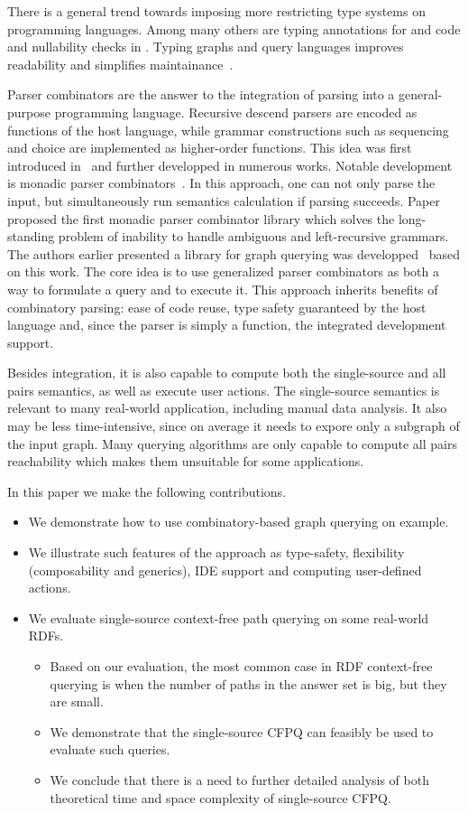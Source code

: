 There is a general trend towards imposing more restricting type systems on programming languages. 
Among many others are typing annotations for \python{} and \typescript{} code and nullability checks in \kotlin{}.
Typing graphs and query languages improves  readability and simplifies maintainance~\cite{10.1145/2076623.2076653}.

Parser combinators are the answer to the integration of parsing into a general-purpose programming language.
Recursive descend parsers are encoded as functions of the host language, while grammar constructions such as sequencing and choice are implemented as higher-order functions. 
This idea was first introduced in~\cite{burge} and further developped in numerous works. 
Notable development is monadic parser combinators~\cite{hutton1996monadic}. 
In this approach, one can not only parse the input, but simultaneously run semantics calculation if parsing succeeds.
Paper~\cite{izmaylova2016practical} proposed the first monadic parser combinator library which solves the long-standing problem of inability to handle ambiguous and left-recursive grammars. 
The authors earlier presented a library for graph querying was developped~\cite{10.1145/3241653.3241655} based on this work. 
The core idea is to use generalized parser combinators as both a way to formulate a query and to execute it. 
This approach inherits benefits of combinatory parsing: ease of code reuse, type safety guaranteed by the host language and, since the parser is simply a function, the integrated development support. 

Besides integration, it is also capable to compute both the single-source and all pairs semantics, as well as execute user actions.
The single-source semantics is relevant to many real-world application, including manual data analysis. 
It also may be less time-intensive, since on average it needs to expore only a subgraph of the input graph. 
Many querying algorithms are only capable to compute all pairs reachability which makes them unsuitable for some applications. 

In this paper we make the following contributions.
\begin{itemize}
  \item We demonstrate how to use combinatory-based graph querying on example. 
  \item We illustrate such features of the approach as type-safety, flexibility (composability and generics), IDE support and computing user-defined actions.
  \item We evaluate single-source context-free path querying on some real-world RDFs.
  \begin{itemize}
    \item Based on our evaluation, the most common case in RDF context-free querying is when the number of paths in the answer set is big, but they are small.  
    \item We demonstrate that the single-source CFPQ can feasibly be used to evaluate such queries. 
    \item We conclude that there is a need to further detailed analysis of both theoretical time and space complexity of single-source CFPQ.
  \end{itemize}
\end{itemize}
